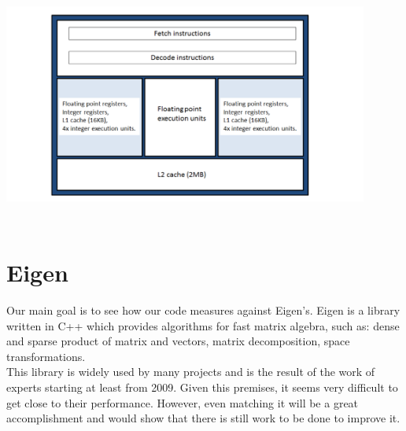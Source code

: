 \documentclass[11pt,a4paper,oneside,titlepage,openright]{book}
\begin{document}
\begin{center}
\includegraphics[width=12cm, height=8cm]{interlagos}
\end{center}

\section{Eigen}
Our main goal is to see how our code measures against Eigen's. 
Eigen is a library written in C++ which provides algorithms for fast matrix algebra, such as: dense and sparse product of matrix and vectors, matrix decomposition, space transformations. \\This library is widely used by many projects and is the result of the work of experts starting at least from 2009. Given this premises, it seems very difficult to get close to their performance. However, even matching it will be a great accomplishment and would show that there is still work to be done to improve it. 
\end{document}

